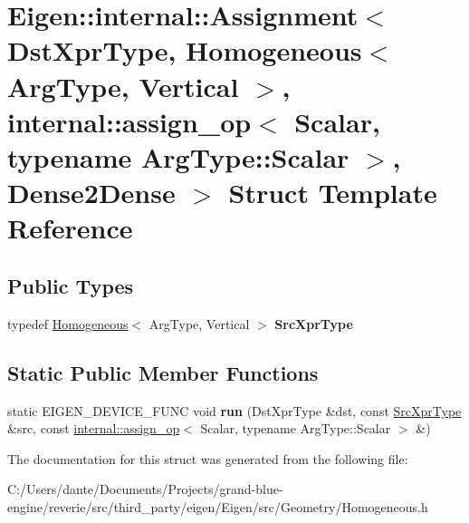 \hypertarget{struct_eigen_1_1internal_1_1_assignment_3_01_dst_xpr_type_00_01_homogeneous_3_01_arg_type_00_01_0510af0d603205dcee3ee308c9bc1bc6}{}\section{Eigen\+::internal\+::Assignment$<$ Dst\+Xpr\+Type, Homogeneous$<$ Arg\+Type, Vertical $>$, internal\+::assign\+\_\+op$<$ Scalar, typename Arg\+Type\+::Scalar $>$, Dense2\+Dense $>$ Struct Template Reference}
\label{struct_eigen_1_1internal_1_1_assignment_3_01_dst_xpr_type_00_01_homogeneous_3_01_arg_type_00_01_0510af0d603205dcee3ee308c9bc1bc6}
\subsection*{Public Types}
\begin{DoxyCompactItemize}
\item 
\mbox{\label{struct_eigen_1_1internal_1_1_assignment_3_01_dst_xpr_type_00_01_homogeneous_3_01_arg_type_00_01_0510af0d603205dcee3ee308c9bc1bc6_a32ad4def77e7d9593c334eb3777447fc}} 
typedef \mbox{\hyperlink{class_eigen_1_1_homogeneous}{Homogeneous}}$<$ Arg\+Type, Vertical $>$ {\bfseries Src\+Xpr\+Type}
\end{DoxyCompactItemize}
\subsection*{Static Public Member Functions}
\begin{DoxyCompactItemize}
\item 
\mbox{\label{struct_eigen_1_1internal_1_1_assignment_3_01_dst_xpr_type_00_01_homogeneous_3_01_arg_type_00_01_0510af0d603205dcee3ee308c9bc1bc6_a770eda3cab096546dd27ba4d5399241d}} 
static E\+I\+G\+E\+N\+\_\+\+D\+E\+V\+I\+C\+E\+\_\+\+F\+U\+NC void {\bfseries run} (Dst\+Xpr\+Type \&dst, const \mbox{\hyperlink{class_eigen_1_1_homogeneous}{Src\+Xpr\+Type}} \&src, const \mbox{\hyperlink{struct_eigen_1_1internal_1_1assign__op}{internal\+::assign\+\_\+op}}$<$ Scalar, typename Arg\+Type\+::\+Scalar $>$ \&)
\end{DoxyCompactItemize}


The documentation for this struct was generated from the following file\+:\begin{DoxyCompactItemize}
\item 
C\+:/\+Users/dante/\+Documents/\+Projects/grand-\/blue-\/engine/reverie/src/third\+\_\+party/eigen/\+Eigen/src/\+Geometry/Homogeneous.\+h\end{DoxyCompactItemize}
